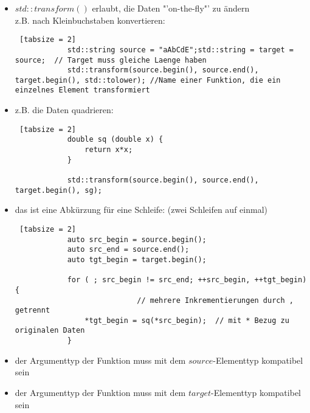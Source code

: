 \documentclass{article}
\begin{document}
	\begin{itemize}
		\item $std::transform()$ erlaubt, die Daten "'on-the-fly"' zu ändern \\
		z.B. nach Kleinbuchstaben konvertieren:
		\begin{lstlisting} [tabsize = 2]
			std::string source = "aAbCdE";std::string = target = source;  // Target muss gleiche Laenge haben
			std::transform(source.begin(), source.end(), target.begin(), std::tolower); //Name einer Funktion, die ein einzelnes Element transformiert
		\end{lstlisting}
		
		\item z.B. die Daten quadrieren:
		\begin{lstlisting} [tabsize = 2]
			double sq (double x) {
				return x*x;
			}
			
			std::transform(source.begin(), source.end(), target.begin(), sg);
		\end{lstlisting}
		
		\item das ist eine Abkürzung für eine Schleife: (zwei Schleifen auf einmal)
		\begin{lstlisting} [tabsize = 2]
			auto src_begin = source.begin();
			auto src_end = source.end();
			auto tgt_begin = target.begin();
			
			for ( ; src_begin != src_end; ++src_begin, ++tgt_begin) {  
							// mehrere Inkrementierungen durch , getrennt
				*tgt_begin = sq(*src_begin);  // mit * Bezug zu originalen Daten
			}
		\end{lstlisting}
		
		\item der Argumenttyp der Funktion muss mit dem $source$-Elementtyp kompatibel sein
		\item der Argumenttyp der Funktion muss mit dem $target$-Elementtyp kompatibel sein
	

\end{itemize}
\end{document}

